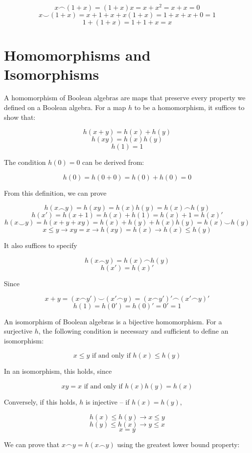 \documentclass{article}
\begin{document}
      \[x \frown (1+x) = (1+x)x = x + x^2 = x + x = 0\]
      \[x \smile (1+x) = x + 1 + x + x(1+x) = 1 + x + x + 0 = 1\]
      \[1 + (1 + x) = 1 + 1 + x = x\]

    \section{Homomorphisms and Isomorphisms}

    A homomorphism of Boolean algebras are maps that preserve every property we
    defined on a Boolean algebra. For a map $h$ to be a homomorphism, it
    suffices to show that:

    \[h(x+y) = h(x) + h(y)\]
    \[h(xy) = h(x)h(y)\]
    \[h(1) = 1\]

    The condition $h(0) = 0$ can be derived from:

    \[h(0) = h(0+0) = h(0)+h(0) = 0\]

    From this definition, we can prove

    \[h(x \frown y) = h(xy) = h(x)h(y) = h(x) \frown h(y)\]
    \[h(x') = h(x+1) = h(x) + h(1) = h(x) + 1 = h(x)'\]
    \[h(x \smile y) = h(x + y + xy) = h(x) + h(y) + h(x)h(y) = h(x) \smile
    h(y)\]
    \[x \leq y \rightarrow xy = x \rightarrow h(xy) = h(x) \rightarrow h(x) \leq
    h(y)\]

    It also suffices to specify

    \[ h(x \frown y) = h(x) \frown h(y) \]
    \[h(x') = h(x)'\]

    Since

    \[x + y = (x \frown y') \smile (x' \frown y) = (x \frown y')' \frown (x'
    \frown y)'\]
    \[h(1) = h(0') = h(0)' = 0' = 1\]

    An isomorphism of Boolean algebras is a bijective homomorphism. For a
    surjective $h$, the following condition is necessary and sufficient to
    define an isomorphism:

    \[x \leq y \text{ if and only if } h(x) \leq h(y) \]

    In an isomorphism, this holds, since

    \[xy = x \text{ if and only if } h(x)h(y) = h(x)\]

    Conversely, if this holds, $h$ is injective -- if $h(x) = h(y)$,

    \[h(x) \leq h(y) \rightarrow x \leq y\]
    \[h(y) \leq h(x) \rightarrow y \leq x\]
    \[x = y\]

    We can prove that $x \frown y = h(x \frown y)$ using the greatest lower
    bound property:
\end{document}
